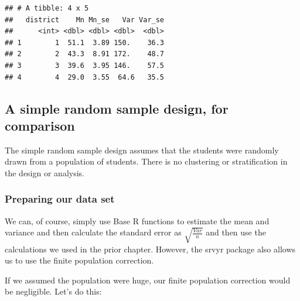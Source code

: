 \documentclass[
]{article}
\begin{document}
\begin{verbatim}
## # A tibble: 4 x 5
##   district    Mn Mn_se   Var Var_se
##      <int> <dbl> <dbl> <dbl>  <dbl>
## 1        1  51.1  3.89 150.    36.3
## 2        2  43.3  8.91 172.    48.7
## 3        3  39.6  3.95 146.    57.5
## 4        4  29.0  3.55  64.6   35.5
\end{verbatim}

\hypertarget{a-simple-random-sample-design-for-comparison}{%
\subsection{A simple random sample design, for comparison}\label{a-simple-random-sample-design-for-comparison}}

The simple random sample design assumes that the students were randomly drawn from a population of students. There is no clustering or stratification in the design or analysis.

\hypertarget{preparing-our-data-set-1}{%
\subsubsection{Preparing our data set}\label{preparing-our-data-set-1}}

We can, of course, simply use Base R functions to estimate the mean and variance and then calculate the standard error as \(\sqrt{\frac{Var}{n}}\) and then use the calculations we used in the prior chapter. However, the srvyr package also allows us to use the finite population correction.

If we assumed the population were huge, our finite population correction would be negligible. Let's do this:
\end{document}
